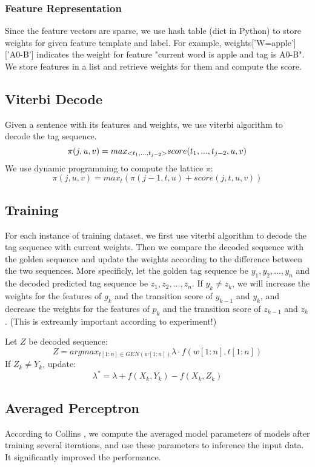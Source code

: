 \documentclass[11pt,a4paper]{article}
\begin{document}
\subsubsection{Feature Representation}
Since the feature vectors are sparse, we use hash table (dict in Python) to store weights for given 
feature template and label. For example, weights['W=apple']['A0-B'] indicates the weight for feature 
"current word is apple and tag is A0-B". We store features in a list and retrieve weights for them and 
compute the score.

\subsection{Viterbi Decode}
Given a sentence with its features and weights, we use viterbi algorithm to decode the 
tag sequence.
\begin{equation}
\pi(j,u,v)=\\
max_{<t_1, ..., t_{j-2}>}score(t_1, ..., t_{j-2}, u, v)
\end{equation}
We use dynamic programming to compute the lattice $\pi$:
\begin{equation}
\pi(j,u,v)=max_t(\pi(j-1,t,u)+score(j,t,u,v))
\end{equation}

\subsection{Training}
For each instance of training dataset, we first use viterbi algorithm to decode the tag sequence 
with current weights. Then we compare the decoded sequence with the golden sequence and update 
the weights according to the difference between the two sequences. More specificly, let the 
golden tag sequence be $y_1, y_2, ..., y_n$ and the decoded predicted tag sequence be 
$z_1, z_2, ..., z_n$. If $y_k \neq z_k$, we will increase the weights for the features of $g_k$ 
and the transition score of $y_{k-1}$ and $y_k$, and decrease the weights for the features of 
$p_k$ and the transition score of $z_{k-1}$ and $z_k$. (This is extreamly important according to
experiment!)

Let $Z$ be decoded sequence:
$$Z=argmax_{t[1:n]\in GEN(w[1:n])} \lambda\cdot f(w[1:n],t[1:n]) $$ 
If $Z_k \neq Y_k$, update:
$$\lambda^* = \lambda + f(X_k, Y_k) - f(X_k, Z_k)$$

\subsection{Averaged Perceptron}
According to Collins \cite{collins2002discriminative}, we compute the 
averaged model parameters of models after training several iterations,
and use these parameters to inference the input data. It significantly 
improved the performance.
\end{document}
